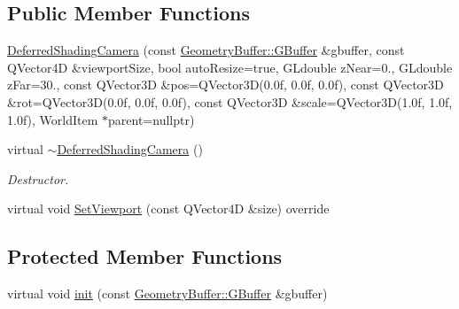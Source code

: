 \subsection*{Public Member Functions}
\begin{DoxyCompactItemize}
\item 
\mbox{\hyperlink{class_geometry_engine_1_1_geometry_world_item_1_1_geometry_camera_1_1_deferred_shading_camera_a111a0e1973ca094ef1a09c10e3244db3}{Deferred\+Shading\+Camera}} (const \mbox{\hyperlink{class_geometry_engine_1_1_geometry_buffer_1_1_g_buffer}{Geometry\+Buffer\+::\+G\+Buffer}} \&gbuffer, const Q\+Vector4D \&viewport\+Size, bool auto\+Resize=true, G\+Ldouble z\+Near=0., G\+Ldouble z\+Far=30., const Q\+Vector3D \&pos=Q\+Vector3D(0.\+0f, 0.\+0f, 0.\+0f), const Q\+Vector3\+D \&rot=\+Q\+Vector3\+D(0.\+0f, 0.\+0f, 0.\+0f), const Q\+Vector3\+D \&scale=\+Q\+Vector3\+D(1.\+0f, 1.\+0f, 1.\+0f), World\+Item $\ast$parent=nullptr)
\item 
\mbox{\label{class_geometry_engine_1_1_geometry_world_item_1_1_geometry_camera_1_1_deferred_shading_camera_ae5eb53c675d8a7ad9070853f4b5d4951}} 
virtual \mbox{\hyperlink{class_geometry_engine_1_1_geometry_world_item_1_1_geometry_camera_1_1_deferred_shading_camera_ae5eb53c675d8a7ad9070853f4b5d4951}{$\sim$\+Deferred\+Shading\+Camera}} ()
\begin{DoxyCompactList}\small\item\em Destructor. \end{DoxyCompactList}\item 
virtual void \mbox{\hyperlink{class_geometry_engine_1_1_geometry_world_item_1_1_geometry_camera_1_1_deferred_shading_camera_a33cb7d45b61f5d4414951bafb3f6a342}{Set\+Viewport}} (const Q\+Vector4D \&size) override
\end{DoxyCompactItemize}
\subsection*{Protected Member Functions}
\begin{DoxyCompactItemize}
\item 
virtual void \mbox{\hyperlink{class_geometry_engine_1_1_geometry_world_item_1_1_geometry_camera_1_1_deferred_shading_camera_a36c689377af8038020678a37535870c8}{init}} (const \mbox{\hyperlink{class_geometry_engine_1_1_geometry_buffer_1_1_g_buffer}{Geometry\+Buffer\+::\+G\+Buffer}} \&gbuffer)
\end{DoxyCompactItemize}
